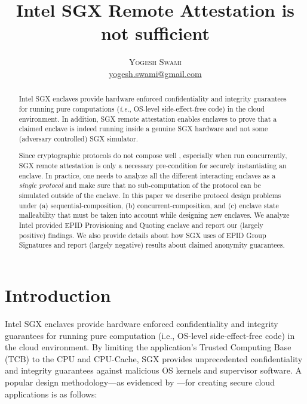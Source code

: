\documentclass[letterpaper]{article}
\title{\bf Intel SGX Remote Attestation is not sufficient}
\author{\textsc{Yogesh Swami}\\\small{\url{yogesh.swami@gmail.com}}}
\date{\lastupdate}
\newcommand{\ie}{\textit{i.e.}}
\begin{document}

\maketitle

\begin{abstract}
  Intel SGX enclaves provide hardware enforced confidentiality and
  integrity guarantees for running pure computations (\ie, OS-level
  side-effect-free code) in the cloud environment. In addition, SGX
  remote attestation enables enclaves to prove that a claimed enclave
  is indeed running inside a genuine SGX hardware and not some
  (adversary controlled) SGX simulator.

  Since cryptographic protocols do not compose well
  \cite{cramerthesis,ucframework,gnuc}, especially when run
  concurrently, SGX remote attestation is only a necessary
  pre-condition for securely instantiating an enclave. In practice,
  one needs to analyze all the different interacting enclaves as a
  \textit{single protocol} and make sure that no sub-computation of
  the protocol can be simulated outside of the enclave. In this paper
  we describe protocol design problems under (a)
  sequential-composition, (b) concurrent-composition, and (c) enclave
  state malleability that must be taken into account while designing
  new enclaves. We analyze Intel provided EPID \cite{epid}
  \textsf{Provisioning} and \textsf{Quoting} enclave \cite{sgxattest}
  and report our (largely positive) findings. We also provide details
  about how SGX uses of EPID Group Signatures and report (largely
  negative) results about claimed anonymity guarantees.

\end{abstract}

\section{Introduction}
\label{sec:intro}
  Intel SGX enclaves\cite{sgxinnov, sgxinnov2} provide hardware
  enforced confidentiality and integrity guarantees for running pure
  computation (i.e., OS-level side-effect-free code) in the
  cloud environment. By limiting the application's Trusted Computing
  Base (TCB) to the CPU and CPU-Cache, SGX provides unprecedented
  confidentiality and integrity guarantees against malicious OS
  kernels and supervisor software. A popular design methodology---as
  evidenced by \cite{Haven, Graphene, Scone}---for creating secure
  cloud applications is as follows:
\end{document}
